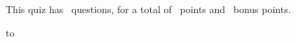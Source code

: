 \documentclass[11pt,answers]{exam}
\begin{document}
\extrawidth{-0.3in}
\pagestyle{headandfoot}

\setlength{\hoffset}{-.25in}

\extraheadheight{-.3in}
\runningheadrule
{} 

\begin{center}
	This quiz has \numquestions\ questions, for a total of \numpoints\
	points and \numbonuspoints\ bonus points.
\end{center}


\firstpagefooter{} %
                {}
                {%
                }
                 
						

\vspace*{0.1cm}
\hbox to 
\vspace{0.1cm}




\end{document}
